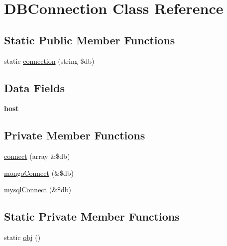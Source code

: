 \hypertarget{class_d_b_connection}{}\section{D\+B\+Connection Class Reference}
\label{class_d_b_connection}
\subsection*{Static Public Member Functions}
\begin{DoxyCompactItemize}
\item 
static \hyperlink{class_d_b_connection_aeb96471cf6f9d9205d22e8b17c2277c3}{connection} (string \$db)
\end{DoxyCompactItemize}
\subsection*{Data Fields}
\begin{DoxyCompactItemize}
\item 
{\bfseries host}
\end{DoxyCompactItemize}
\subsection*{Private Member Functions}
\begin{DoxyCompactItemize}
\item 
\hyperlink{class_d_b_connection_a1191ef26fe6381a3bfbd33c0c6f7b9f4}{connect} (array \&\$db)
\item 
\hyperlink{class_d_b_connection_a4db4ce6ff1cf378867220c6694b8bc05}{mongo\+Connect} (\&\$db)
\item 
\hyperlink{class_d_b_connection_ab7140b0e933334f00374b6675c60ffaf}{mysql\+Connect} (\&\$db)
\end{DoxyCompactItemize}
\subsection*{Static Private Member Functions}
\begin{DoxyCompactItemize}
\item 
static \hyperlink{class_d_b_connection_a2b99fe8f4ca4b64909ce7b499e71dfb6}{obj} ()
\end{DoxyCompactItemize}

